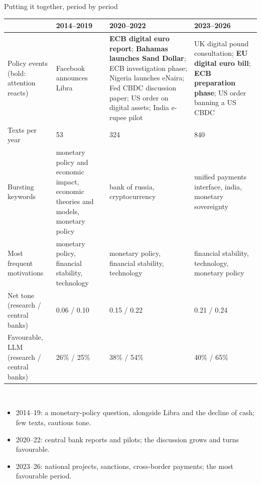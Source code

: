 \documentclass[aspectratio=169,10pt]{beamer}
\begin{document}
\begin{frame}{Putting it together, period by period}
\scriptsize
\setlength{\tabcolsep}{4pt}
\tiny
\begin{tabular}{@{}p{}p{}p{}p{}@{}}\toprule
 & \textbf{2014--2019} & \textbf{2020--2022} & \textbf{2023--2026}\\\midrule
Policy events (bold: attention reacts) & Facebook announces Libra & \textbf{ECB digital euro report}; \textbf{Bahamas launches Sand Dollar}; ECB investigation phase; Nigeria launches eNaira; Fed CBDC discussion paper; US order on digital assets; India e-rupee pilot & UK digital pound consultation; \textbf{EU digital euro bill}; \textbf{ECB preparation phase}; US order banning a US CBDC \\
Texts per year & 53 & 324 & 840 \\
Bursting keywords & monetary policy and economic impact, economic theories and models, monetary policy & bank of russia, cryptocurrency & unified payments interface, india, monetary sovereignty \\
Most frequent motivations & monetary policy, financial stability, technology & monetary policy, financial stability, technology & financial stability, technology, monetary policy \\
Net tone (research / central banks) & 0.06 / 0.10 & 0.15 / 0.22 & 0.21 / 0.24 \\
Favourable, LLM (research / central banks) & 26\% / 25\% & 38\% / 54\% & 40\% / 65\% \\
\bottomrule\end{tabular}\\[2pt]
\scriptsize
\begin{itemize}\setlength\itemsep{0pt}
\item \alert{2014--19}: a monetary-policy question, alongside Libra and the decline of cash; few texts, cautious tone.
\item \alert{2020--22}: central bank reports and pilots; the discussion grows and turns favourable.
\item \alert{2023--26}: national projects, sanctions, cross-border payments; the most favourable period.

\end{itemize}
\end{frame}
\end{document}
